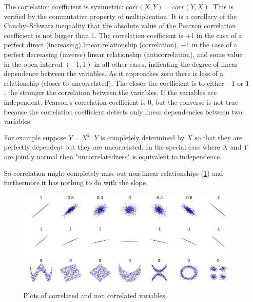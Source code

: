 \documentclass[12pt, letterpaper]{article}
\theoremstyle{definition}
\begin{document}
The correlation coefficient is symmetric: $corr(X,Y)=corr (Y,X)$. This is verified by the commutative property of multiplication.
It is a corollary of the Cauchy–Schwarz inequality that the absolute value of the Pearson correlation coefficient is not bigger than 1. The correlation coefficient is +1 in the case of a perfect direct (increasing) linear relationship (correlation), $-1$ in the case of a perfect decreasing (inverse) linear relationship (anticorrelation), and some value in the open interval 
$(-1,1)$ in all other cases, indicating the degree of linear dependence between the variables. As it approaches zero there is less of a relationship (closer to uncorrelated). The closer the coefficient is to either $-1$ or $1$, the stronger the correlation between the variables.
If the variables are independent, Pearson's correlation coefficient is $0$, but the converse is not true because the correlation coefficient detects only linear dependencies between two variables.

For example suppose $Y=X^2$. $Y$ is completely determined by $X$ so that they are perfectly dependent but they are uncorrelated.
In the special case where $X$ and $Y$ are jointly normal then "uncorrelatedness" is equivalent to independence.

So correlation might completely miss out non-linear relationships (\ref{corr}) and furthermore it has nothing to do with the slope.
\begin{figure}
\centering
\includegraphics[scale=0.137]{img/corr}
\caption{Plots of correlated and non correlated variables.}
\label{corr}
\end{figure}
\end{document}
